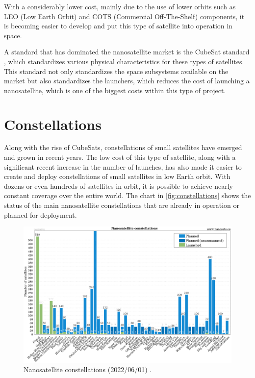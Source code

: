 With a considerably lower cost, mainly due to the use of lower orbits such as LEO (Low Earth Orbit) and COTS (Commercial Off-The-Shelf) components, it is becoming easier to develop and put this type of satellite into operation in space.

A standard that has dominated the nanosatellite market is the CubeSat standard \cite{cds}, which standardizes various physical characteristics for these types of satellites. This standard not only standardizes the space subsystems available on the market but also standardizes the launchers, which reduces the cost of launching a nanosatellite, which is one of the biggest costs within this type of project.

\section{Constellations}

Along with the rise of CubeSats, constellations of small satellites have emerged and grown in recent years. The low cost of this type of satellite, along with a significant recent increase in the number of launches, has also made it easier to create and deploy constellations of small satellites in low Earth orbit. With dozens or even hundreds of satellites in orbit, it is possible to achieve nearly constant coverage over the entire world. The chart in \autoref{fig:constellations} shows the status of the main nanosatellite constellations that are already in operation or planned for deployment.

\begin{figure}[!ht]
    \begin{center}
        \includegraphics[width=\columnwidth]{figures/Nanosats_constellations_2022-06-01}
        \caption{Nanosatellite constellations (2022/06/01) \cite{nanosatseu}.}
        \label{fig:constellations}
    \end{center}
\end{figure}

